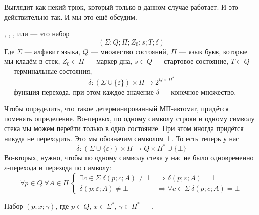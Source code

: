 \documentclass{article}
\begin{document}
\begin{itemize}
\begin{Example}
\begin{figure}[H]
            \end{figure}\noindent
            Выглядит как некий трюк, который только в данном случае работает. И это действительно так. И мы это ещё обсудим.
        \end{Example}
        \dfn {}, , ,  или  --- это набор
        $$
        (\Sigma;Q;\Pi;Z_0;s;T;\delta)
        $$
        Где $\Sigma$ --- алфавит языка, $Q$ --- множество состояний, $\Pi$ --- язык букв, которые мы кладём в стек, $Z_0\in\Pi$ --- маркер дна, $s\in Q$ --- стартовое состояние, $T\subset Q$ --- терминальные состояния,
        $$\delta\colon(\Sigma\cup\{\varepsilon\})\times\Pi\to2^{Q\times\Pi^*}$$
        --- функция перехода, при этом каждое значение $\delta$ --- конечное множество.
        \pagebreak
        \begin{Comment}
            Чтобы определить, что такое детерминированный МП-автомат, придётся поменять определение. Во-первых, по одному символу строки и одному символу стека мы можем перейти только в одно состояние. При этом иногда придётся никуда не переходить. Это мы обозначим символом $\bot$. То есть теперь у нас
            $$\delta\colon(\Sigma\cup\{\varepsilon\})\times\Pi\to Q\times\Pi^*\cup\{\bot\}$$
            Во-вторых, нужно, чтобы по одному символу стека у нас не было одновременно $\varepsilon$-перехода и перехода по символу:
            $$
            \forall p\in Q~\forall A\in\Pi~\left\{\begin{aligned}
                \exists c\in\Sigma~\delta(p;c;A)\neq\bot&\Rightarrow\delta(p;\varepsilon;A)=\bot\\
                \delta(p;\varepsilon;A)\neq\bot&\Rightarrow\forall c\in\Sigma~\delta(p;c;A)=\bot
            \end{aligned}\right.
            $$
        \end{Comment}
        \dfn Набор $(p;x;\gamma)$, где $p\in Q$, $x\in\Sigma^*$, $\gamma\in\Pi^*$ --- .

\end{itemize}
\end{document}
